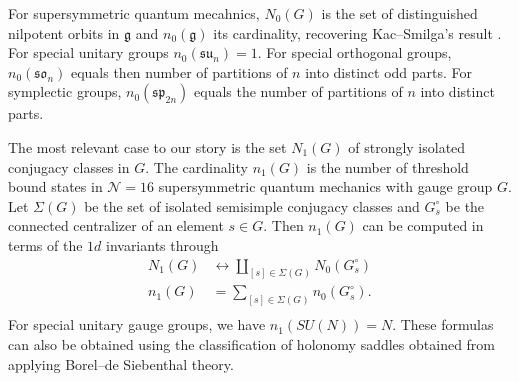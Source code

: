 \documentclass[12pt]{article}
\numberwithin{equation}{section}%
\theoremstyle{definition}
\newcommand{\fsu}{\mathfrak{su}}
\newcommand{\fso}{\mathfrak{so}}
\newcommand{\fsp}{\mathfrak{sp}}
\begin{document}
For supersymmetric quantum mecahnics, $N_0(G)$ is the set of distinguished nilpotent orbits in $\mathfrak{g}$ and $n_0(\mathfrak{g})$ its cardinality, recovering Kac--Smilga's result \cite{Kac:1999av}.  For special unitary groups $n_0(\fsu_n) = 1$. For special orthogonal groups, $n_0(\fso_n)$ equals then number of partitions of $n$ into distinct odd parts.  For symplectic groups, $n_0(\fsp_{2n})$ equals the number of partitions of $n$ into distinct parts. 

The most relevant case to our story is the set $N_1(G)$ of strongly isolated conjugacy classes in $G$.
The cardinality $n_1(G)$ is the number of threshold bound states in $\mathcal{N} = 16$ supersymmetric quantum mechanics with gauge group $G.$
Let $\Sigma(G)$ be the set of isolated
semisimple conjugacy classes and $G^{\circ}_s$ be the connected centralizer of an element $s \in G$. Then $n_1(G)$ can be computed in terms of the $1d$ invariants through
\begin{align*}
N_1(G) & \leftrightarrow \coprod_{[s] \in \Sigma(G)} N_0(G^{\circ}_s) \\
n_1(G) & = \sum_{[s] \in \Sigma(G)} n_0(G^{\circ}_s). \\
\end{align*}
For special unitary gauge groups, we have $n_1(SU(N)) = N$. These formulas can also be obtained using the classification of holonomy saddles obtained from applying Borel--de Siebenthal theory.
\end{document}
